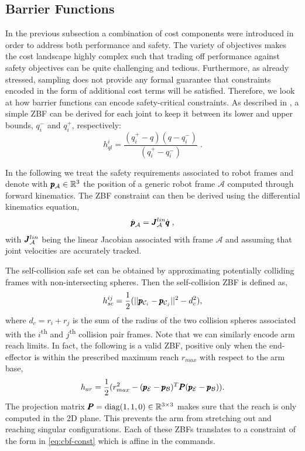 \subsection{Barrier Functions}
In the previous subsection a combination of cost components were introduced in order to address both performance and safety. The variety of objectives makes the cost landscape highly complex such that trading off performance against safety objectives can be quite challenging and tedious. Furthermore, as already stressed, sampling does not provide any formal guarantee that constraints encoded in the form of additional cost terms will be satisfied. Therefore, we look at how barrier functions can encode safety-critical constraints. As described in \cite{benzi2021optimization}, a simple ZBF can be derived for each joint to keep it between its lower and upper bounds, $q_i^-$ and $q_i^+$, respectively:
\begin{equation}
h_{ql}^i = \frac{(q_i^+ - q)(q - q_i^-)}{(q_i^+ - q_i^-)}\;.
\end{equation}

In the following we treat the safety requirements associated to robot frames and denote with $\pmb{p}_{\mathcal{A}} \in \mathbb{R}^{3}$ the position of a generic robot frame $\mathcal{A}$ computed through forward kinematics. The ZBF constraint can then be derived using the differential kinematics equation,
\begin{equation}
    \dot{\pmb{p}}_{\mathcal{A}} = \pmb{J}^{lin}_{\mathcal{A}} \dot{\pmb{q}}\;,
\end{equation}
with $\pmb{J}^{lin}_{\mathcal{A}}$ being the linear Jacobian associated with frame $\mathcal{A}$ and assuming that joint velocities are accurately tracked. 

The self-collision safe set can be obtained by approximating potentially colliding frames with non-intersecting spheres. Then the self-collision ZBF is defined as,
\begin{equation}
    h_{sc}^{ij} = \frac{1}{2}(||\pmb{p}_{\mathcal{C}_i} - \pmb{p}_{\mathcal{C}_j}||^2 - d_c^2),
\end{equation}
where $d_c = r_i + r_j$ is the sum of the radius of the two collision spheres associated with the $i$\textsuperscript{th}  and $j$\textsuperscript{th} collision pair frames. Note that we can similarly encode arm reach limits. In fact, the following is a valid ZBF, positive only when the end-effector is within the prescribed maximum reach $r_{max}$ with respect to the arm base,
\begin{equation}
    h_{ar} = \frac{1}{2}(r_{max}^2 - (\pmb{p}_{\mathcal{E}} - \pmb{p}_{\mathcal{B}})^T \pmb{P} (\pmb{p}_{\mathcal{E}} - \pmb{p}_{\mathcal{B}}) ).
\end{equation}
The projection matrix $\pmb{P} = \text{diag}(1, 1, 0) \in \mathbb{R}^{3 \times 3}$ makes sure that the reach is only computed in the 2D plane. This prevents the arm from stretching out and reaching singular configurations. Each of these ZBFs translates to a constraint of the form in \eqref{eq:cbf-const} which is affine in the commands. 


